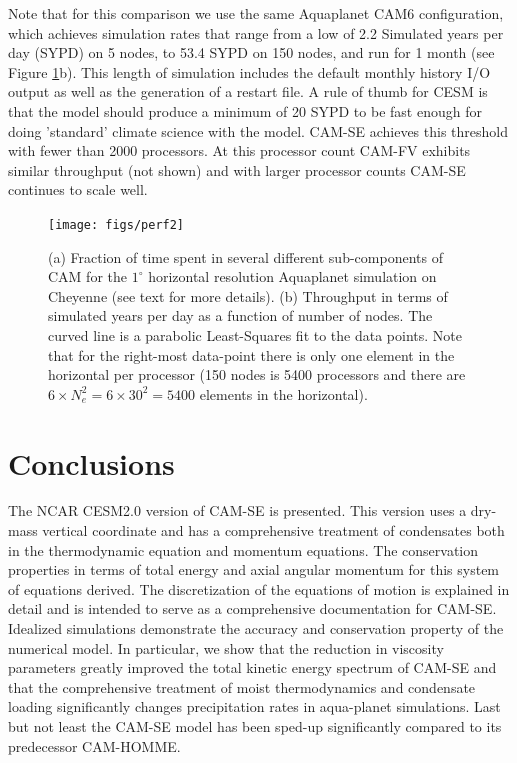 \documentclass{agujournal}
\begin{document}
{Note that for this comparison we use the same Aquaplanet CAM6 configuration, which achieves simulation rates that range from a low of 2.2 Simulated years per day (SYPD) on 5 nodes, to 53.4 SYPD on 150 nodes, and run for 1 month (see Figure \ref{fig:percent}b). This length of simulation includes the default monthly history I/O output as well as the generation of a restart file. A rule of thumb for CESM is that the model should produce a minimum of 20 SYPD to be fast enough for doing 'standard' climate science with the model. CAM-SE achieves this threshold with fewer than 2000 processors. At this processor count CAM-FV exhibits similar throughput (not shown) and with larger processor counts CAM-SE continues to scale well.

\begin{figure}[h]
\centering
 \texttt{[image: figs/perf2]}
 \caption{(a) Fraction of time spent in several different sub-components of CAM for the $1^\circ$ horizontal resolution Aquaplanet simulation on Cheyenne (see text for more details). (b) Throughput in terms of simulated years per day as a function of number of nodes. The curved line is a parabolic Least-Squares fit to the data points. Note that for the right-most data-point there is only one element in the horizontal per processor (150 nodes is 5400 processors and there are $6\times N_e^2=6\times 30^2=5400$ elements in the horizontal).}
 \label{fig:percent}
\end{figure}



\section{Conclusions}\label{sec:concl}
The NCAR CESM2.0 version of CAM-SE is presented. This version uses a dry-mass vertical coordinate and has a comprehensive treatment of condensates both in the thermodynamic equation and momentum equations. The conservation properties in terms of total energy and axial angular momentum for this system of equations derived. The discretization of the equations of motion is explained in detail and is intended to serve as a comprehensive documentation for CAM-SE. Idealized simulations demonstrate the accuracy and conservation property of the numerical model. In particular, we show that the reduction in viscosity parameters greatly improved the total kinetic energy spectrum of CAM-SE and that the comprehensive treatment of moist thermodynamics and condensate loading significantly changes precipitation rates in aqua-planet simulations. Last but not least the CAM-SE model has been sped-up significantly compared to its predecessor CAM-HOMME.

}
\end{document}
